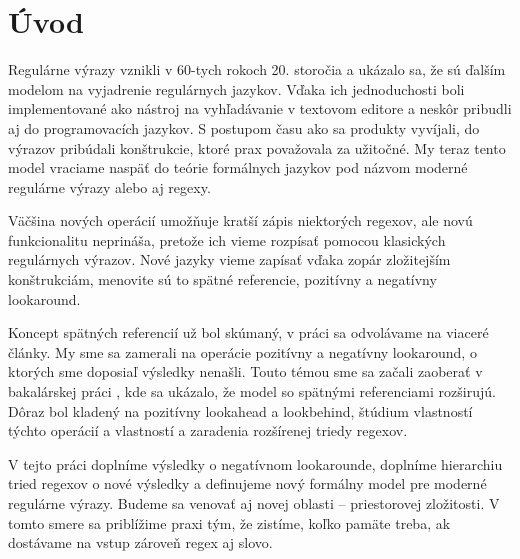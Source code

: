 \chapter*{Úvod}
\label{chap:uvod}
{}

Regulárne výrazy vznikli v 60-tych rokoch 20. storočia a ukázalo sa, že sú ďalším modelom na vyjadrenie regulárnych jazykov. Vďaka ich jednoduchosti boli implementované ako nástroj na vyhľadávanie v textovom editore a neskôr pribudli aj do programovacích jazykov. S postupom času ako sa produkty vyvíjali, do výrazov pribúdali konštrukcie, ktoré prax považovala za užitočné. My teraz tento model vraciame naspäť do teórie formálnych jazykov pod názvom moderné regulárne výrazy alebo aj regexy.

Väčšina nových operácií umožňuje kratší zápis niektorých regexov, ale novú fun\-kcio\-na\-li\-tu neprináša, pretože ich vieme rozpísať pomocou klasických regulárnych výrazov. Nové jazyky vieme zapísať vďaka zopár zložitejším konštrukciám, menovite sú to spätné referencie, pozitívny a negatívny lookaround.

Koncept spätných referencií už bol skúmaný, v práci sa odvolávame na viaceré články. My sme sa zamerali na operácie pozitívny a negatívny lookaround, o ktorých sme doposiaľ výsledky nenašli. Touto témou sme sa začali zaoberať v bakalárskej práci \cite{mojaBak}, kde sa ukázalo, že model so spätnými referenciami rozširujú. Dôraz bol kladený na pozitívny lookahead a lookbehind, štúdium vlastností týchto operácií a vlastností a zaradenia rozšírenej triedy regexov.

V tejto práci doplníme výsledky o negatívnom lookarounde, doplníme hierarchiu tried regexov o nové výsledky a definujeme nový formálny model pre moderné regulárne výrazy. Budeme sa venovať aj novej oblasti -- priestorovej zložitosti. V tomto smere sa priblížime praxi tým, že zistíme, koľko pamäte treba, ak dostávame na vstup zároveň regex aj slovo.
